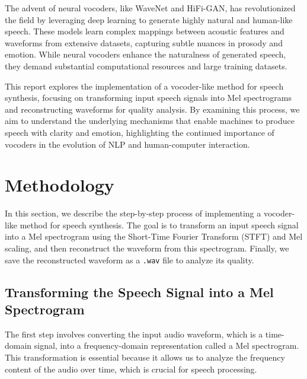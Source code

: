 \documentclass[12pt]{article}
\begin{document}
The advent of neural vocoders, like WaveNet and HiFi-GAN, has revolutionized the field by leveraging deep learning to generate highly natural and human-like speech. These models learn complex mappings between acoustic features and waveforms from extensive datasets, capturing subtle nuances in prosody and emotion. While neural vocoders enhance the naturalness of generated speech, they demand substantial computational resources and large training datasets.

This report explores the implementation of a vocoder-like method for speech synthesis, focusing on transforming input speech signals into Mel spectrograms and reconstructing waveforms for quality analysis. By examining this process, we aim to understand the underlying mechanisms that enable machines to produce speech with clarity and emotion, highlighting the continued importance of vocoders in the evolution of NLP and human-computer interaction.

\newpage






\section{Methodology}

In this section, we describe the step-by-step process of implementing a vocoder-like method for speech synthesis. The goal is to transform an input speech signal into a Mel spectrogram using the Short-Time Fourier Transform (STFT) and Mel scaling, and then reconstruct the waveform from this spectrogram. Finally, we save the reconstructed waveform as a \texttt{.wav} file to analyze its quality.

\subsection{Transforming the Speech Signal into a Mel Spectrogram}

The first step involves converting the input audio waveform, which is a time-domain signal, into a frequency-domain representation called a Mel spectrogram. This transformation is essential because it allows us to analyze the frequency content of the audio over time, which is crucial for speech processing.
\end{document}
